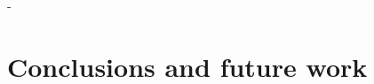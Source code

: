 \documentclass{article}
\begin{document}
    - 

\section{Conclusions and future work}

\newpage{}

\end{document}
